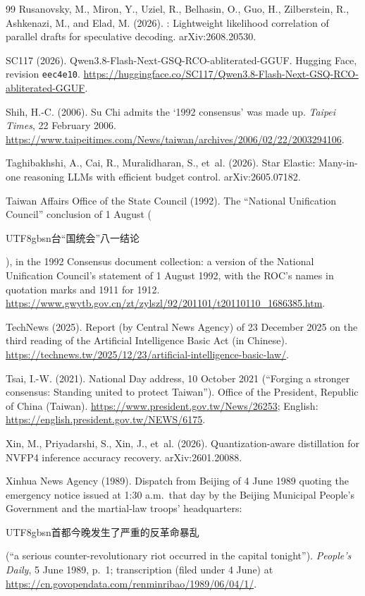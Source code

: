 \documentclass[11pt,a4paper]{article}
\newcommand{\zhs}[1]{\begin{CJK}{UTF8}{gbsn}#1\end{CJK}}
\begin{document}
\begin{thebibliography}{99}
Rusanovsky, M., Miron, Y., Uziel, R., Belhasin, O., Guo, H., Zilberstein, R., Ashkenazi, M., and Elad, M. (2026).
: Lightweight likelihood correlation of parallel drafts for speculative decoding.
\newblock arXiv:2608.20530.

SC117 (2026).
\newblock Qwen3.8-Flash-Next-GSQ-RCO-abliterated-GGUF.
\newblock Hugging Face, revision \texttt{eec4e10}.
\newblock \url{https://huggingface.co/SC117/Qwen3.8-Flash-Next-GSQ-RCO-abliterated-GGUF}.

Shih, H.-C. (2006).
\newblock Su Chi admits the `1992 consensus' was made up. \emph{Taipei Times}, 22 February 2006.
\newblock \url{https://www.taipeitimes.com/News/taiwan/archives/2006/02/22/2003294106}.

Taghibakhshi, A., Cai, R., Muralidharan, S., et~al. (2026).
\newblock Star Elastic: Many-in-one reasoning {LLMs} with efficient budget control.
\newblock arXiv:2605.07182.

Taiwan Affairs Office of the State Council (1992).
\newblock The ``National Unification Council'' conclusion of 1 August (\zhs{台“国统会”八一结论}), in the 1992
Consensus document collection: a version of the National Unification Council's statement of 1 August 1992, with
the ROC's names in quotation marks and 1911 for 1912.
\newblock \url{https://www.gwytb.gov.cn/zt/zylszl/92/201101/t20110110_1686385.htm}.

TechNews (2025).
\newblock Report (by Central News Agency) of 23 December 2025 on the third reading of the Artificial Intelligence
Basic Act (in Chinese).
\newblock \url{https://technews.tw/2025/12/23/artificial-intelligence-basic-law/}.

Tsai, I.-W. (2021).
\newblock National Day address, 10 October 2021 (``Forging a stronger consensus: Standing united to protect
Taiwan''). Office of the President, Republic of China (Taiwan).
\newblock \url{https://www.president.gov.tw/News/26253}; English: \url{https://english.president.gov.tw/NEWS/6175}.

Xin, M., Priyadarshi, S., Xin, J., et~al. (2026).
\newblock Quantization-aware distillation for {NVFP4} inference accuracy recovery.
\newblock arXiv:2601.20088.

Xinhua News Agency (1989).
\newblock Dispatch from Beijing of 4 June 1989 quoting the emergency notice issued at 1:30 a.m.\ that day by the
Beijing Municipal People's Government and the martial-law troops' headquarters: \zhs{首都今晚发生了严重的反革命暴乱}
(``a serious counter-revolutionary riot occurred in the capital tonight'').
\newblock \emph{People's Daily}, 5 June 1989, p.~1; transcription (filed under 4 June) at
\url{https://cn.govopendata.com/renminribao/1989/06/04/1/}.

\end{thebibliography}
\end{document}
